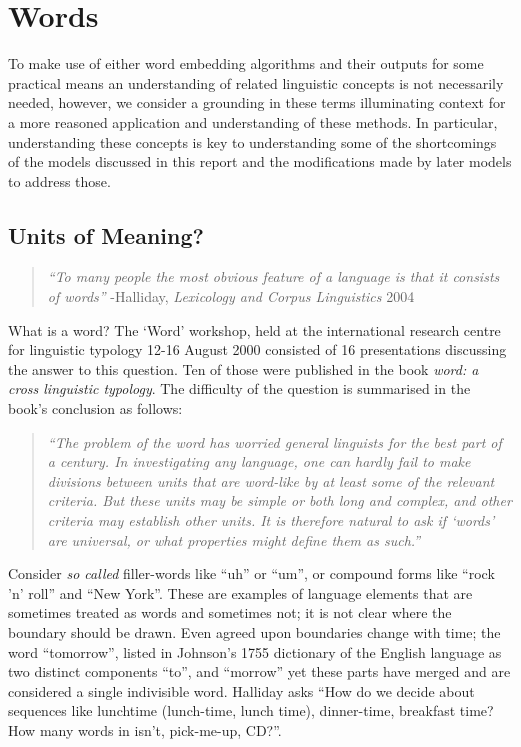 \chapter{Words}
To make use of either word embedding algorithms and their outputs for some practical means an understanding of related linguistic concepts is not necessarily needed, however, we consider a grounding in these terms illuminating context for a more reasoned application and understanding of these methods. In particular, understanding these concepts is key to understanding some of the shortcomings of the models discussed in this report and the modifications made by later models to address those.

\section{Units of Meaning?}
\begin{quote}
  \emph{``To many people the most obvious feature of a language is that it consists of words''} -Halliday, \emph{Lexicology and Corpus Linguistics} 2004
\end{quote}


What is a word? The `Word' workshop, held at the international research centre for linguistic typology 12-16 August 2000 consisted of 16 presentations discussing the answer to this question. Ten of those were published in the book \emph{word: a cross linguistic typology}. The difficulty of the question is summarised in the book's conclusion as follows:

\begin{quote}
\emph{``The problem of the word has worried general linguists for the best part of a century. In investigating any language, one can hardly fail to make divisions between units that are word-like by at least some of the relevant criteria. But these units may be simple or both long and complex, and other criteria may establish other units. It is therefore natural to ask if ‘words’ are universal, or what properties might define them as such.''}
\end{quote}

Consider \emph{so called} filler-words like ``uh'' or ``um'', or compound forms like ``rock 'n' roll'' and ``New York''. These are examples of language elements that are sometimes treated as words and sometimes not; it is not clear where the boundary should be drawn. Even agreed upon boundaries change with time; the word ``tomorrow'', listed in Johnson's 1755 dictionary of the English language as two distinct components ``to'', and ``morrow'' yet these parts have merged and are considered a single indivisible word. Halliday asks ``How do we decide about sequences like lunchtime (lunch-time, lunch time), dinner-time, breakfast time? How many words in isn't, pick-me-up, CD?''.

